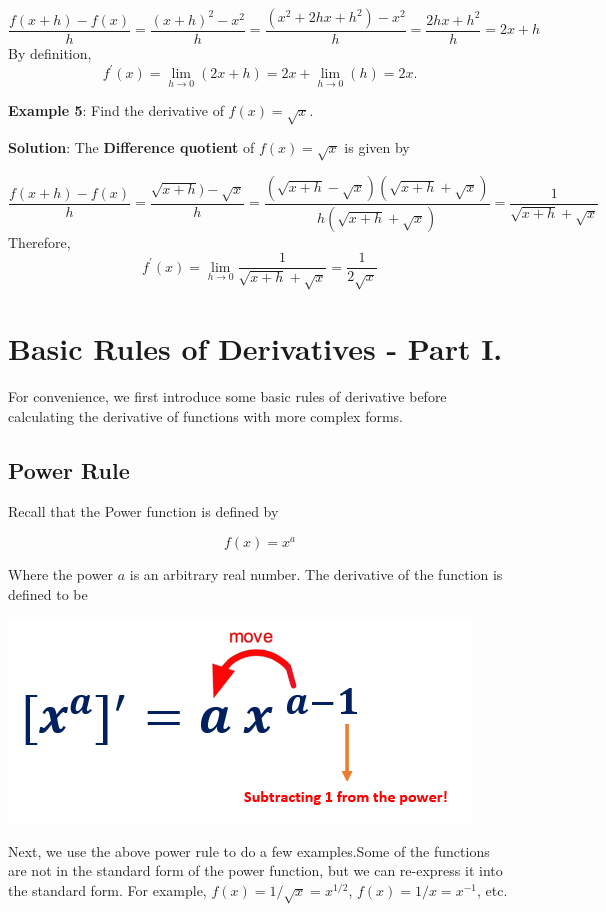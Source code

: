 \documentclass[
]{book}
\begin{document}
\[
\frac{f(x+h)-f(x)}{h} = \frac{(x+h)^2-x^2}{h} = \frac{(x^2+2hx+h^2)-x^2}{h} = \frac{2hx+h^2}{h} =2x+h 
\]
By definition,
\[
f^\prime(x) = \lim_{h \to 0} (2x +h) = 2x + \lim_{h \to 0}(h) = 2x.
\]

\hfill\break

\textbf{Example 5}: Find the derivative of \(f(x) = \sqrt{x}\).

\textbf{Solution}: The \textbf{Difference quotient} of \(f(x) = \sqrt{x}\) is given by

\[
\frac{f(x+h) - f(x)}{h} = \frac{\sqrt{x+h})-\sqrt{x}}{h} = \frac{(\sqrt{x+h}-\sqrt{x})(\sqrt{x+h}+\sqrt{x})}{h(\sqrt{x+h}+\sqrt{x})} = \frac{1}{\sqrt{x+h}+\sqrt{x}}
\]
Therefore,
\[
f^\prime(x) = \lim_{h \to 0}\frac{1}{\sqrt{x+h}+\sqrt{x}} = \frac{1}{2\sqrt{x}}
\]

\hfill\break

\hypertarget{basic-rules-of-derivatives---part-i.}{%
\section{Basic Rules of Derivatives - Part I.}\label{basic-rules-of-derivatives---part-i.}}

For convenience, we first introduce some basic rules of derivative before calculating the derivative of functions with more complex forms.

\hypertarget{power-rule-3}{%
\subsection{Power Rule}\label{power-rule-3}}

Recall that the Power function is defined by

\[
f(x) = x^a
\]

Where the power \(a\) is an arbitrary real number. The derivative of the function is defined to be

\begin{center}\includegraphics[width=0.45\linewidth]{img02/w02note-PowerRule} \end{center}

Next, we use the above power rule to do a few examples.Some of the functions are not in the standard form of the power function, but we can re-express it into the standard form. For example, \(f(x) = 1/\sqrt{x} = x^{1/2}\), \(f(x) = 1/x = x^{-1}\), etc.
\end{document}

